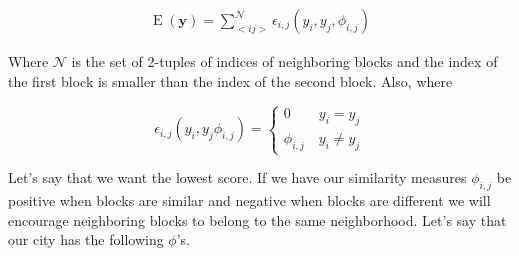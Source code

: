 \documentclass[12pt,draft,letter]{article}
\begin{document}
\begin{align}
\operatorname{E}(\mathbf{y}) = \sum_{<i j>}^{\mathcal{N}}\epsilon_{i,j}(y_i,y_j,\phi_{i,j})
\end{align}

Where $\mathcal{N}$ is the set of 2-tuples of indices of neighboring
blocks and the index of the first block is smaller than the index of
the second block. Also, where

\begin{equation}
\epsilon_{i,j}(y_i,y_j\phi_{i,j}) = \begin{cases}
  0 \quad\quad y_i = y_j \\
  \phi_{i,j} \quad y_i \neq y_j
\end{cases}
\end{equation}

Let's say that we want the lowest score. If we have our similarity
measures $\phi_{i,j}$ be positive when blocks are similar and negative
when blocks are different we will encourage neighboring blocks to
belong to the same neighborhood. Let's say that our city has the
following $\phi$'s.
\end{document}
